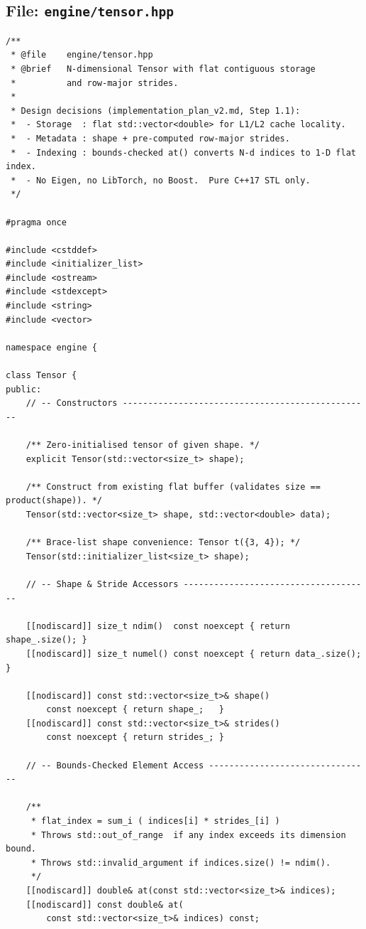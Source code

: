 \documentclass[12pt, a4paper]{article}
\begin{document}
\newpage
\subsection{File: \texttt{engine/tensor.hpp}}

\begin{lstlisting}[caption={\texttt{engine/tensor.hpp} - complete header}]
/**
 * @file    engine/tensor.hpp
 * @brief   N-dimensional Tensor with flat contiguous storage
 *          and row-major strides.
 *
 * Design decisions (implementation_plan_v2.md, Step 1.1):
 *  - Storage  : flat std::vector<double> for L1/L2 cache locality.
 *  - Metadata : shape + pre-computed row-major strides.
 *  - Indexing : bounds-checked at() converts N-d indices to 1-D flat index.
 *  - No Eigen, no LibTorch, no Boost.  Pure C++17 STL only.
 */

#pragma once

#include <cstddef>
#include <initializer_list>
#include <ostream>
#include <stdexcept>
#include <string>
#include <vector>

namespace engine {

class Tensor {
public:
    // -- Constructors -------------------------------------------------

    /** Zero-initialised tensor of given shape. */
    explicit Tensor(std::vector<size_t> shape);

    /** Construct from existing flat buffer (validates size == product(shape)). */
    Tensor(std::vector<size_t> shape, std::vector<double> data);

    /** Brace-list shape convenience: Tensor t({3, 4}); */
    Tensor(std::initializer_list<size_t> shape);

    // -- Shape & Stride Accessors -------------------------------------

    [[nodiscard]] size_t ndim()  const noexcept { return shape_.size(); }
    [[nodiscard]] size_t numel() const noexcept { return data_.size();  }

    [[nodiscard]] const std::vector<size_t>& shape()
        const noexcept { return shape_;   }
    [[nodiscard]] const std::vector<size_t>& strides()
        const noexcept { return strides_; }

    // -- Bounds-Checked Element Access --------------------------------

    /**
     * flat_index = sum_i ( indices[i] * strides_[i] )
     * Throws std::out_of_range  if any index exceeds its dimension bound.
     * Throws std::invalid_argument if indices.size() != ndim().
     */
    [[nodiscard]] double& at(const std::vector<size_t>& indices);
    [[nodiscard]] const double& at(
        const std::vector<size_t>& indices) const;


\end{lstlisting}
\end{document}
